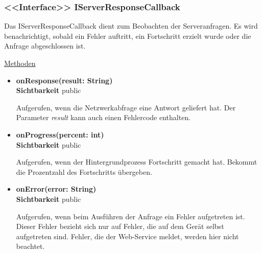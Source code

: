 \subsubsection{<<Interface>> IServerResponseCallback} \label{app:klasse:IServerResponseCallback}
Das IServerResponseCallback dient zum Beobachten der Serveranfragen. Es wird benachrichtigt, sobald ein Fehler auftritt, ein Fortschritt erzielt wurde oder die Anfrage abgeschlossen ist.
\newline

\underline{Methoden}
\begin{itemize}
\itemsep0pt
\item \textbf{onResponse(result: String)}\hfill\\
\textbf{Sichtbarkeit} public

Aufgerufen, wenn die Netzwerkabfrage eine Antwort geliefert hat. Der Parameter \textit{result} kann auch einen Fehlercode enthalten.

\item \textbf{onProgress(percent: int)}\hfill\\
\textbf{Sichtbarkeit} public

Aufgerufen, wenn der Hintergrundprozess Fortschritt gemacht hat. Bekommt die Prozentzahl des Fortschritts übergeben.

\item \textbf{onError(error: String)}\hfill\\
\textbf{Sichtbarkeit} public

Aufgerufen, wenn beim Ausführen der Anfrage ein Fehler aufgetreten ist. Dieser Fehler bezieht sich nur auf Fehler, die auf dem Gerät selbst aufgetreten sind. Fehler, die der Web-Service meldet, werden hier nicht beachtet.

\end{itemize}